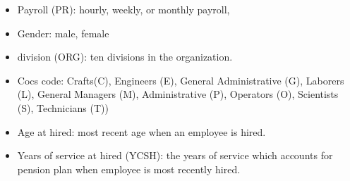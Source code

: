 \documentclass[12pt,letterpaper]{article}
\begin{document}
\begin{itemize}
	\item Payroll (PR): hourly, weekly, or monthly payroll,
	\item Gender: male, female
	\item division (ORG): ten divisions in the organization.
	\item Cocs code: Crafts(C), Engineers (E), General Administrative (G), Laborers (L), General Managers (M),  Administrative (P),  Operators (O), Scientists (S), Technicians (T))
	\item Age at hired: most recent age when an employee is hired.
	\item Years of service at hired (YCSH): the years of service which accounts for pension plan when employee is most recently hired.
	
\end{itemize}
\end{document}
